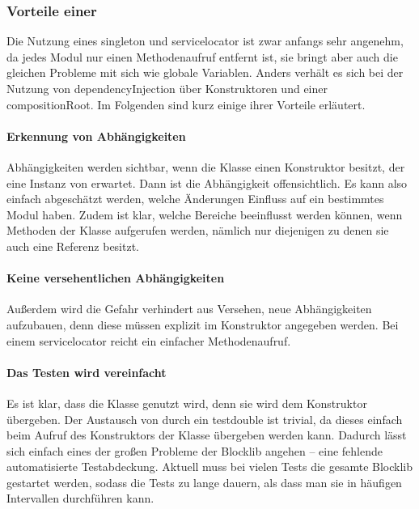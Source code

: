 \subsubsection{Vorteile einer }

Die Nutzung eines \gls{singleton} und \gls{servicelocator} ist zwar anfangs sehr angenehm, da jedes Modul nur einen Methodenaufruf entfernt ist, sie bringt aber auch die gleichen Probleme mit sich wie globale Variablen. Anders verhält es sich bei der Nutzung von \gls{dependencyInjection} über Konstruktoren und einer \gls{compositionRoot}. Im Folgenden sind kurz einige ihrer Vorteile erläutert.

\paragraph{Erkennung von Abhängigkeiten}Abhängigkeiten werden sichtbar, wenn die Klasse einen Konstruktor besitzt, der eine Instanz von \classWorldInteraction{} erwartet. Dann ist die Abhängigkeit offensichtlich. Es kann also einfach abgeschätzt werden, welche Änderungen Einfluss auf ein bestimmtes Modul haben. Zudem ist klar, welche Bereiche beeinflusst werden können, wenn Methoden der Klasse aufgerufen werden, nämlich nur diejenigen zu denen sie auch eine Referenz besitzt.

\paragraph{Keine versehentlichen Abhängigkeiten} Außerdem wird die Gefahr verhindert aus Versehen, neue Abhängigkeiten aufzubauen, denn diese müssen explizit im Konstruktor angegeben werden. Bei einem \gls{servicelocator} reicht ein einfacher Methodenaufruf.

\paragraph{Das Testen wird vereinfacht} Es ist klar, dass die Klasse \classWorldInteraction{} genutzt wird, denn sie wird dem Konstruktor übergeben. Der Austausch von \classWorldInteraction{} durch ein \gls{testdouble} ist trivial, da dieses einfach beim Aufruf des Konstruktors der Klasse übergeben werden kann. Dadurch lässt sich einfach eines der großen Probleme der Blocklib angehen -- eine fehlende automatisierte Testabdeckung. Aktuell muss bei vielen Tests die gesamte Blocklib gestartet werden, sodass die Tests zu lange dauern, als dass man sie in häufigen Intervallen durchführen kann.

